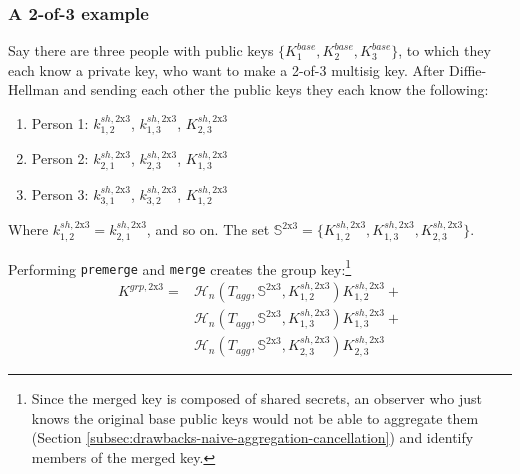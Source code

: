 \subsubsection*{A 2-of-3 example}

Say there are three people with public keys $\{K^{base}_1,K^{base}_2,K^{base}_3\}$, to which they each know a private key, who want to make a 2-of-3 multisig key. After Diffie-Hellman and sending each other the public keys they each know the following:
\begin{enumerate}
    \item Person 1: $k^{sh,\textrm{2x3}}_{1,2}$, $k^{sh,\textrm{2x3}}_{1,3}$, $K^{sh,\textrm{2x3}}_{2,3}$
    \item Person 2: $k^{sh,\textrm{2x3}}_{2,1}$, $k^{sh,\textrm{2x3}}_{2,3}$, $K^{sh,\textrm{2x3}}_{1,3}$
    \item Person 3: $k^{sh,\textrm{2x3}}_{3,1}$, $k^{sh,\textrm{2x3}}_{3,2}$, $K^{sh,\textrm{2x3}}_{1,2}$
\end{enumerate}

Where $k^{sh,\textrm{2x3}}_{1,2} = k^{sh,\textrm{2x3}}_{2,1}$, and so on. The set $\mathbb{S}^{\textrm{2x3}} = \{ K^{sh,\textrm{2x3}}_{1,2}, K^{sh,\textrm{2x3}}_{1,3}, K^{sh,\textrm{2x3}}_{2,3}\}$.

Performing {\tt premerge} and {\tt merge} creates the group key:\footnote{Since the merged key is composed of shared secrets, an observer who just knows the original base public keys would not be able to aggregate them (Section \ref{subsec:drawbacks-naive-aggregation-cancellation}) and identify members of the merged key.}\vspace{.175cm}
\begin{align*}
    K^{grp,\textrm{2x3}} = &\mathcal{H}_n(T_{agg},\mathbb{S}^{\textrm{2x3}},K^{sh,\textrm{2x3}}_{1,2}) K^{sh,\textrm{2x3}}_{1,2} + \\
                           &\mathcal{H}_n(T_{agg},\mathbb{S}^{\textrm{2x3}},K^{sh,\textrm{2x3}}_{1,3}) K^{sh,\textrm{2x3}}_{1,3} + \\
                           &\mathcal{H}_n(T_{agg},\mathbb{S}^{\textrm{2x3}},K^{sh,\textrm{2x3}}_{2,3}) K^{sh,\textrm{2x3}}_{2,3}
\end{align*}

